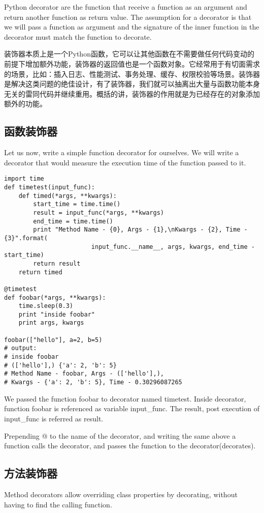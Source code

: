 Python decorator are the function that receive a function as an argument and return another function as return value. The assumption for a decorator is that we will pass a function as argument and the signature of the inner function in the decorator must match the function to decorate.

装饰器本质上是一个Python函数，它可以让其他函数在不需要做任何代码变动的前提下增加额外功能，装饰器的返回值也是一个函数对象。它经常用于有切面需求的场景，比如：插入日志、性能测试、事务处理、缓存、权限校验等场景。装饰器是解决这类问题的绝佳设计，有了装饰器，我们就可以抽离出大量与函数功能本身无关的雷同代码并继续重用。概括的讲，装饰器的作用就是为已经存在的对象添加额外的功能。

\subsection{函数装饰器}
Let us now, write a simple function decorator for ourselves. We will write a decorator that would measure the execution time of the function passed to it.
\begin{verbatim}
import time
def timetest(input_func):
    def timed(*args, **kwargs):
        start_time = time.time()
        result = input_func(*args, **kwargs)
        end_time = time.time()
        print "Method Name - {0}, Args - {1},\nKwargs - {2}, Time - {3}".format(
                        input_func.__name__, args, kwargs, end_time - start_time)
        return result
    return timed

@timetest
def foobar(*args, **kwargs):
    time.sleep(0.3)
    print "inside foobar"
    print args, kwargs

foobar(["hello"], a=2, b=5)
# output:
# inside foobar
# (['hello'],) {'a': 2, 'b': 5}
# Method Name - foobar, Args - (['hello'],),
# Kwargs - {'a': 2, 'b': 5}, Time - 0.30296087265
\end{verbatim}

We passed the function foobar to decorator named timetest. Inside decorator, function foobar is referenced as variable input\_func. The result, post execution of input\_func is referred as result.

Prepending @ to the name of the decorator, and writing the same above a function calls the decorator, and passes the function to the decorator(decorates).

\subsection{方法装饰器}
Method decorators allow overriding class properties by decorating, without having to find the calling function.

